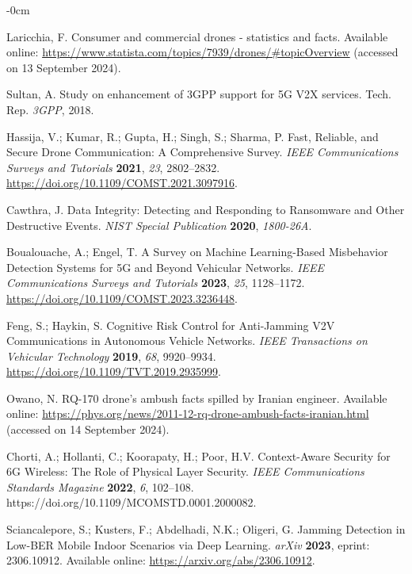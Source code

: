 \documentclass[futureinternet,article,submit,pdftex,moreauthors]{Definitions/mdpi}
\begin{document}
\begin{adjustwidth}{-\extralength}{0cm}
\begin{thebibliography}{999}
Laricchia, F. Consumer and commercial drones - statistics and facts. Available online: \url{https://www.statista.com/topics/7939/drones/\#topicOverview} (accessed on 13 September 2024).

Sultan, A. Study on enhancement of 3GPP support for 5G V2X services. Tech. Rep. {\em 3GPP}, 2018.

Hassija, V.; Kumar, R.; Gupta, H.; Singh, S.; Sharma, P. Fast, Reliable, and Secure Drone Communication: A Comprehensive Survey. {\em IEEE Communications Surveys and Tutorials} {\bf 2021}, {\em 23}, 2802--2832. \url{https://doi.org/10.1109/COMST.2021.3097916}.

Cawthra, J. Data Integrity: Detecting and Responding to Ransomware and Other Destructive Events. {\em NIST Special Publication} {\bf 2020}, {\em 1800-26A}.

Boualouache, A.; Engel, T. A Survey on Machine Learning-Based Misbehavior Detection Systems for 5G and Beyond Vehicular Networks. {\em IEEE Communications Surveys and Tutorials} {\bf 2023}, {\em 25}, 1128--1172. \url{https://doi.org/10.1109/COMST.2023.3236448}.

Feng, S.; Haykin, S. Cognitive Risk Control for Anti-Jamming V2V Communications in Autonomous Vehicle Networks. {\em IEEE Transactions on Vehicular Technology} {\bf 2019}, {\em 68}, 9920--9934. \url{https://doi.org/10.1109/TVT.2019.2935999}.

Owano, N. RQ-170 drone's ambush facts spilled by Iranian engineer. Available online: \url{https://phys.org/news/2011-12-rq-drone-ambush-facts-iranian.html} (accessed on 14 September 2024).

Chorti, A.; Hollanti, C.; Koorapaty, H.; Poor, H.V. Context-Aware Security for 6G Wireless: The Role of Physical Layer Security. {\em IEEE Communications Standards Magazine} {\bf 2022}, {\em 6}, 102--108. https://doi.org/10.1109/MCOMSTD.0001.2000082.

Sciancalepore, S.; Kusters, F.; Abdelhadi, N.K.; Oligeri, G. Jamming Detection in Low-BER Mobile Indoor Scenarios via Deep Learning. {\em arXiv} {\bf 2023}, eprint: 2306.10912. Available online: \url{https://arxiv.org/abs/2306.10912}.


\end{thebibliography}
\end{adjustwidth}
\end{document}
